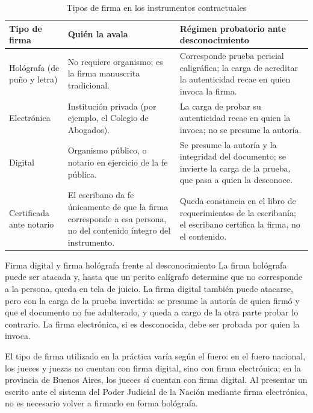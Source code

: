 \documentclass[12pt,oneside]{book}
\begin{document}
\begin{table}[H]
\centering
\caption{Tipos de firma en los instrumentos contractuales}
\begin{tabularx}{\textwidth}{>{\raggedright\arraybackslash}p{} X X}
\toprule
\textbf{Tipo de firma} & \textbf{Quién la avala} & \textbf{Régimen probatorio ante desconocimiento} \\
\midrule
Hológrafa (de puño y letra) & No requiere organismo; es la firma manuscrita tradicional. & Corresponde prueba pericial caligráfica; la carga de acreditar la autenticidad recae en quien invoca la firma. \\
Electrónica & Institución privada (por ejemplo, el Colegio de Abogados). & La carga de probar su autenticidad recae en quien la invoca; no se presume la autoría. \\
Digital & Organismo público, o notario en ejercicio de la fe pública. & Se presume la autoría y la integridad del documento; se invierte la carga de la prueba, que pasa a quien la desconoce. \\
Certificada ante notario & El escribano da fe únicamente de que la firma corresponde a esa persona, no del contenido íntegro del instrumento. & Queda constancia en el libro de requerimientos de la escribanía; el escribano certifica la firma, no el contenido. \\
\bottomrule
\end{tabularx}
\end{table}

\begin{example}{Firma digital y firma hológrafa frente al desconocimiento}
La firma hológrafa puede ser atacada y, hasta que un perito calígrafo determine que no corresponde a la persona, queda en tela de juicio. La firma digital también puede atacarse, pero con la carga de la prueba invertida: se presume la autoría de quien firmó y que el documento no fue adulterado, y queda a cargo de la otra parte probar lo contrario. La firma electrónica, si es desconocida, debe ser probada por quien la invoca.
\end{example}

\begin{note}
El tipo de firma utilizado en la práctica varía según el fuero: en el fuero nacional, los jueces y juezas no cuentan con firma digital, sino con firma electrónica; en la provincia de Buenos Aires, los jueces sí cuentan con firma digital. Al presentar un escrito ante el sistema del Poder Judicial de la Nación mediante firma electrónica, no es necesario volver a firmarlo en forma hológrafa.
\end{note}
\end{document}
